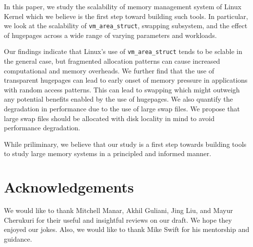 \documentclass[twocolumn,11pt]{article}
\begin{document}
In this paper, we study the scalability of memory management 
system of Linux Kernel which we believe is the first step toward building such tools. In particular, 
we look at the scalability of \texttt{vm\_area\_struct},  
swapping subsystem, and the effect of hugepages across a wide range of varying parameters
and workloads. 

Our findings indicate that Linux's use of
\texttt{vm\_area\_struct} tends to be sclable in the general case, but
fragmented allocation patterns can cause increased computational and memory
overheads. We further find that the use of 
transparent hugepages can lead to early onset of memory pressure in applications
with random access patterns. 
This can lead to swapping which might outweigh any potential benefits enabled by the use of hugepages. 
We also quantify the degradation in performance due to the use of large swap
files. We propose that large swap files should be allocated with disk locality
in mind to avoid performance degradation.   

While priliminary, we believe that our study is a first step towards building tools 
to study large memory systems in a principled and informed manner. 
 

\section{Acknowledgements}

We would like to thank Mitchell Manar, Akhil Guliani, Jing Liu, and Mayur
Cherukuri for their useful and insightful reviews on our draft. We hope they
enjoyed our jokes. Also, we would like to thank Mike Swift for his mentorship
and guidance.


{}

\end{document}
